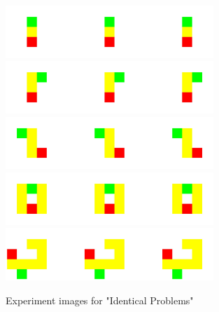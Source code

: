\begin{figure}[h!]
\centering
\includegraphics[width=0.7\textwidth]{experiment_images/i1.png}
\includegraphics[width=0.7\textwidth]{experiment_images/i2.png}
\includegraphics[width=0.7\textwidth]{experiment_images/i3.png}
\includegraphics[width=0.7\textwidth]{experiment_images/i4.png}
\includegraphics[width=0.7\textwidth]{experiment_images/i5.png}
\caption{Experiment images for "Identical Problems"}
\end{figure}